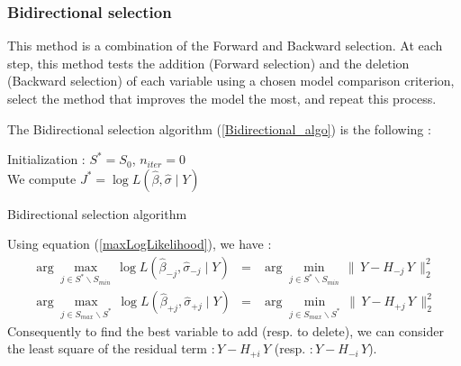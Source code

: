\newpage
\subsubsection{Bidirectional selection}

This method is a combination of the Forward and Backward selection. At each step, this method tests
the addition (Forward selection) and the deletion (Backward selection) of each variable using a chosen model comparison criterion,
select the method that improves the model the most, and repeat this process.

The Bidirectional selection algorithm (\ref{Bidirectional_algo}) is the following :
\begin{algorithm}
\label{Bidirectional_algo}
Initialization : $S^* = S_0$, $n_{iter} = 0 $\\
We compute $J^* = \log L(\hat{\beta},\hat{\sigma}\mid Y)$  \\
\caption{Bidirectional selection algorithm }
\end{algorithm}

Using equation (\ref{maxLogLikelihood}), we have :
 \begin{eqnarray}
 \arg   \displaystyle\max_{j \in S^*\backslash S_{min}}\,  \log L(\hat{\beta}_{-j},\hat{\sigma}_{-j}\mid Y) &=&
\arg \displaystyle\min_{j \in S^*\backslash S_{min}}\, \|\,Y-H_{-j}\,Y\,\|^2_2  \\
\arg   \displaystyle\max_{j \in S_{max} \backslash S^*}\,  \log L(\hat{\beta}_{+j},\hat{\sigma}_{+j}\mid Y)  &=&
\arg \displaystyle\min_{j \in S_{max} \backslash S^*}\, \|\,Y-H_{+j}\,Y\,\|^2_2
 \end{eqnarray}
 Consequently to find the best variable to add (resp. to delete), we can consider the least square of the residual term $:Y-H_{+i}\,Y$
 (resp.  $:Y-H_{-i}\,Y$).

